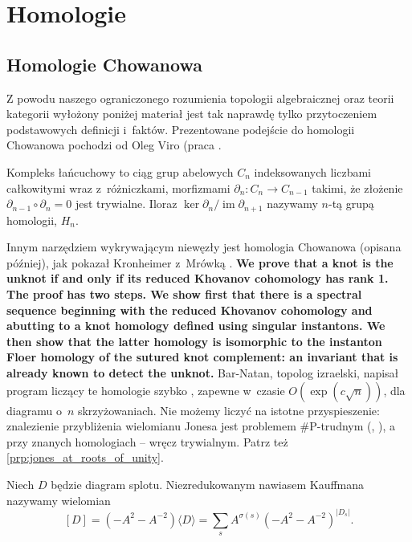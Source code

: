 \section{Homologie}


\subsection{Homologie Chowanowa}

Z powodu naszego ograniczonego rozumienia topologii algebraicznej oraz teorii kategorii
wyłożony poniżej materiał jest tak naprawdę tylko przytoczeniem podstawowych definicji i~faktów.
Prezentowane podejście do homologii Chowanowa pochodzi od Oleg Viro (praca \cite{viro04}.

Kompleks łańcuchowy to ciąg grup abelowych $C_n$ indeksowanych liczbami całkowitymi
wraz z~różniczkami, morfizmami $\partial_n \colon C_n \to C_{n-1}$ takimi,
że złożenie $\partial_{n-1} \circ \partial_n = 0$ jest trywialne.
Iloraz $\ker \partial_n / \operatorname{im} \partial_{n+1}$ nazywamy $n$-tą grupą homologii, $H_n$.

Innym narzędziem wykrywającym niewęzły jest homologia Chowanowa (opisana później),
jak pokazał Kronheimer z~Mrówką \cite{kronheimer11}.
\textbf{We prove that a knot is the unknot if and only if its reduced Khovanov cohomology has rank 1. The proof has two steps. We show first that there is a spectral sequence beginning with the reduced Khovanov cohomology and abutting to a knot homology defined using singular instantons. We then show that the latter homology is isomorphic to the instanton Floer homology of the sutured knot complement: an invariant that is already known to detect the unknot.}
Bar-Natan, topolog izraelski, napisał program liczący te homologie szybko \cite{barnatan07},
zapewne w~czasie $O(\exp(c \sqrt n))$, dla diagramu o~$n$ skrzyżowaniach.
Nie możemy liczyć na istotne przyspieszenie:
znalezienie przybliżenia wielomianu Jonesa jest problemem \#P-trudnym (\cite{kuperberg15}, \cite{vertigan05}),
a przy znanych homologiach -- wręcz trywialnym.
Patrz też \ref{prp:jones_at_roots_of_unity}.


\begin{definition}
    Niech $D$ będzie diagram splotu.
    Niezredukowanym nawiasem Kauffmana nazywamy wielomian
    \[
        [D] = (-A^2 - A^{-2}) \langle D \rangle = \sum_s A^{\sigma(s)} (-A^2 - A^{-2})^{|D_s|}.
    \]
\end{definition}


